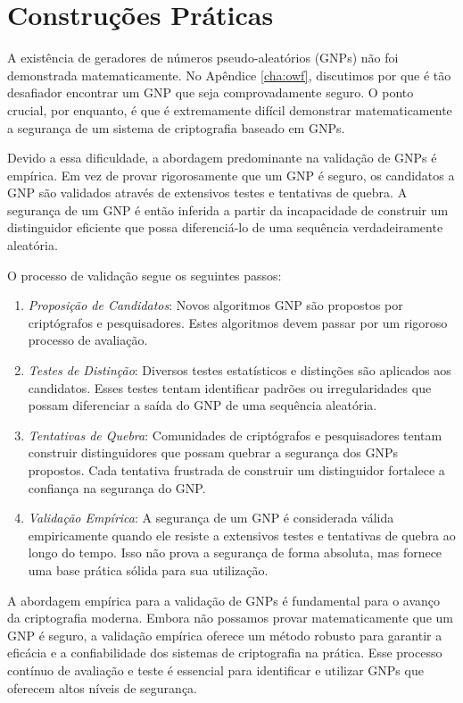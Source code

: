 \section{Construções Práticas}
\label{sec:construcoes-praticas}

A existência de geradores de números pseudo-aleatórios (GNPs) não foi demonstrada matematicamente.
No Apêndice \ref{cha:owf}, discutimos por que é tão desafiador encontrar um GNP que seja comprovadamente seguro.
O ponto crucial, por enquanto, é que é extremamente difícil demonstrar matematicamente a segurança de um sistema de criptografia baseado em GNPs.

Devido a essa dificuldade, a abordagem predominante na validação de GNPs é empírica.
Em vez de provar rigorosamente que um GNP é seguro, os candidatos a GNP são validados através de extensivos testes e tentativas de quebra.
A segurança de um GNP é então inferida a partir da incapacidade de construir um distinguidor eficiente que possa diferenciá-lo de uma sequência verdadeiramente aleatória.

O processo de validação segue os seguintes passos:
\begin{enumerate}
\item[] {\em Proposição de Candidatos}:
  Novos algoritmos GNP são propostos por criptógrafos e pesquisadores.
  Estes algoritmos devem passar por um rigoroso processo de avaliação.
\item[] {\em Testes de Distinção}:
  Diversos testes estatísticos e distinções são aplicados aos candidatos.
  Esses testes tentam identificar padrões ou irregularidades que possam diferenciar a saída do GNP de uma sequência aleatória.
\item[] {\em Tentativas de Quebra}:
  Comunidades de criptógrafos e pesquisadores tentam construir distinguidores que possam quebrar a segurança dos GNPs propostos.
  Cada tentativa frustrada de construir um distinguidor fortalece a confiança na segurança do GNP.
\item[] {\em Validação Empírica}:
  A segurança de um GNP é considerada válida empiricamente quando ele resiste a extensivos testes e tentativas de quebra ao longo do tempo.
  Isso não prova a segurança de forma absoluta, mas fornece uma base prática sólida para sua utilização.
\end{enumerate}

A abordagem empírica para a validação de GNPs é fundamental para o avanço da criptografia moderna.
Embora não possamos provar matematicamente que um GNP é seguro, a validação empírica oferece um método robusto para garantir a eficácia e a confiabilidade dos sistemas de criptografia na prática.
Esse processo contínuo de avaliação e teste é essencial para identificar e utilizar GNPs que oferecem altos níveis de segurança.

